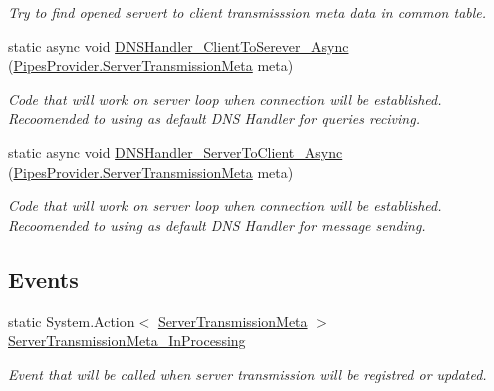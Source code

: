 \begin{DoxyCompactItemize}
\begin{DoxyCompactList}\small\item\em Try to find opened servert to client transmisssion meta data in common table. \end{DoxyCompactList}\item 
static async void \mbox{\hyperlink{class_pipes_provider_1_1_a_p_i_ade8af5541a5787e55fe07bad71298132}{D\+N\+S\+Handler\+\_\+\+Client\+To\+Serever\+\_\+\+Async}} (\mbox{\hyperlink{class_pipes_provider_1_1_server_transmission_meta}{Pipes\+Provider.\+Server\+Transmission\+Meta}} meta)
\begin{DoxyCompactList}\small\item\em Code that will work on server loop when connection will be established. Recoomended to using as default D\+NS Handler for queries reciving. \end{DoxyCompactList}\item 
static async void \mbox{\hyperlink{class_pipes_provider_1_1_a_p_i_af1648503e83d5ecd72af553ea5d461f5}{D\+N\+S\+Handler\+\_\+\+Server\+To\+Client\+\_\+\+Async}} (\mbox{\hyperlink{class_pipes_provider_1_1_server_transmission_meta}{Pipes\+Provider.\+Server\+Transmission\+Meta}} meta)
\begin{DoxyCompactList}\small\item\em Code that will work on server loop when connection will be established. Recoomended to using as default D\+NS Handler for message sending. \end{DoxyCompactList}\end{DoxyCompactItemize}
\subsection*{Events}
\begin{DoxyCompactItemize}
\item 
static System.\+Action$<$ \mbox{\hyperlink{class_pipes_provider_1_1_server_transmission_meta}{Server\+Transmission\+Meta}} $>$ \mbox{\hyperlink{class_pipes_provider_1_1_a_p_i_a88d536e98d1ea1c34d4331fef67a7561}{Server\+Transmission\+Meta\+\_\+\+In\+Processing}}
\begin{DoxyCompactList}\small\item\em Event that will be called when server transmission will be registred or updated. \end{DoxyCompactList}\end{DoxyCompactItemize}

